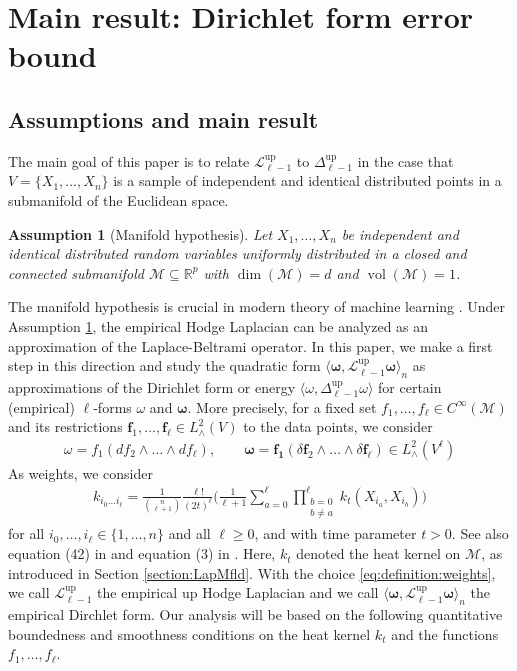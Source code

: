 \documentclass[10pt]{article}
\DeclareMathOperator{\up}{up}
\theoremstyle{plain}
\newtheorem{assumption}{Assumption}
\theoremstyle{definition}
\theoremstyle{remark}
\begin{document}
\section{Main result: Dirichlet form error bound} \label{section:mainResult}

\subsection{Assumptions and main result}

The main goal of this paper is to relate $\mathscr{L}_{\ell-1}^{\up}$ to $\Delta_{\ell-1}^{\up}$ in the case that $V=\{X_1,\dots,X_n\}$ is a sample of independent and identical distributed points in a submanifold of the Euclidean space. 

\begin{assumption}[Manifold hypothesis]\label{Ass:MH} Let $X_1,\dots,X_n$ be independent and identical distributed random variables uniformly distributed in a closed and connected submanifold $\mathcal{M}\subseteq\mathbb{R}^p$ with $\dim(\mathcal{M})=d$ and $\operatorname{vol}(\mathcal{M})=1$.
\end{assumption}

The manifold hypothesis is crucial in modern theory of machine learning \cite{MR2964193}. Under Assumption \ref{Ass:MH}, the empirical Hodge Laplacian can be analyzed as an approximation of the Laplace-Beltrami operator. In this paper, we make a first step in this direction and study the quadratic form $\langle\boldsymbol{\omega},\mathscr{L}_{\ell-1}^{\up}\boldsymbol{\omega}\rangle_n$ as approximations of the Dirichlet form or energy $\langle\omega,\Delta_{\ell-1}^{\up}\omega\rangle$ for certain (empirical) $\ell$-forms $\omega$ and $\boldsymbol{\omega}$. More precisely, for a fixed set $f_1,\dots,f_\ell\in C^\infty(\mathcal{M})$ and its restrictions $\mathbf{f}_1,\dots,\mathbf{f}_\ell\in L^2_\wedge(V)$ to the data points, we consider 
\begin{align}\label{eq:definition:emprical:l:form}
    \omega=f_1(df_2\wedge\dots\wedge df_\ell),\qquad\boldsymbol{\omega}=\mathbf{f_1}(\delta\mathbf{f}_2\wedge\dots\wedge \delta\mathbf{f_\ell})\in L^2_\wedge(V^{\ell})
\end{align}
As weights, we consider 
\begin{align}\label{eq:definition:weights}
    k_{i_0\dots i_\ell}=\frac{1}{\binom{n}{\ell+1}}\frac{\ell !}{(2t)^\ell}\Big(\frac{1}{\ell+1}\sum_{a=0}^\ell\prod_{\substack{b=0\\b\neq a}}^\ell k_t(X_{i_a},X_{i_b})\Big)
\end{align}
for all $i_0,\dots,i_\ell\in\{1,\dots,n\}$ and all $\ell\geq 0$, and with time parameter $t>0$. See also equation (42) in \cite{HK24} and equation (3) in \cite{Smale12}. Here, $k_t$ denoted the heat kernel on $\mathcal{M}$, as introduced in Section \ref{section:LapMfld}. With the choice \eqref{eq:definition:weights}, we call $\mathscr{L}_{\ell-1}^{\up}$ the empirical up Hodge Laplacian and we call $\langle\boldsymbol{\omega},\mathscr{L}_{\ell-1}^{\up}\boldsymbol{\omega}\rangle_n$ the empirical Dirchlet form.  Our analysis will be based on the following quantitative boundedness and smoothness conditions on the heat kernel $k_t$ and the functions $f_1,\dots,f_\ell$. 
\end{document}
